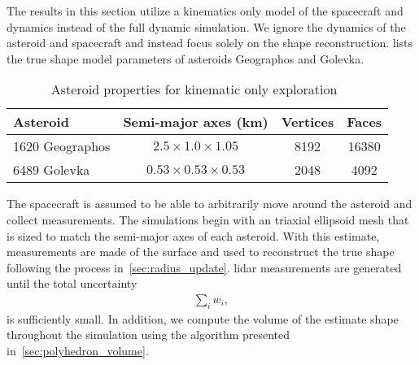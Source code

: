 \documentclass[letterpaper, paper,11pt]{AAS}		%
\begin{document}
The results in this section utilize a kinematics only model of the spacecraft and dynamics instead of the full dynamic simulation. 
We ignore the dynamics of the asteroid and spacecraft and instead focus solely on the shape reconstruction.
 lists the true shape model parameters of asteroids Geographos and Golevka.
\begin{table}[htbp]
    \centering
    \begin{tabular}{lccc}
        \toprule
        Asteroid & Semi-major axes (\si{\kilo\meter}) & Vertices & Faces\\
        \midrule
        \num{1620} Geographos & \( 2.5 \times 1.0 \times 1.05 \) & \num{8192} & \num{16380}  \\
        \num{6489} Golevka & \( 0.53 \times 0.53 \times 0.53 \)  & \num{2048} & \num{4092} \\
        \bottomrule
    \end{tabular} 
    \caption{Asteroid properties for kinematic only exploration~\label{tab:kinematic_asteroids}}
\end{table}
The spacecraft is assumed to be able to arbitrarily move around the asteroid and collect measurements.
The simulations begin with an triaxial ellipsoid mesh that is sized to match the semi-major axes of each asteroid.
With this estimate, measurements are made of the surface and used to reconstruct the true shape following the process in~\cref{sec:radius_update}.
\Gls{lidar} measurements are generated until the total uncertainty
\begin{align*}
    \sum_i w_i,
\end{align*}
is sufficiently small.
In addition, we compute the volume of the estimate shape throughout the simulation using the algorithm presented in~\cref{sec:polyhedron_volume}.
\end{document}
